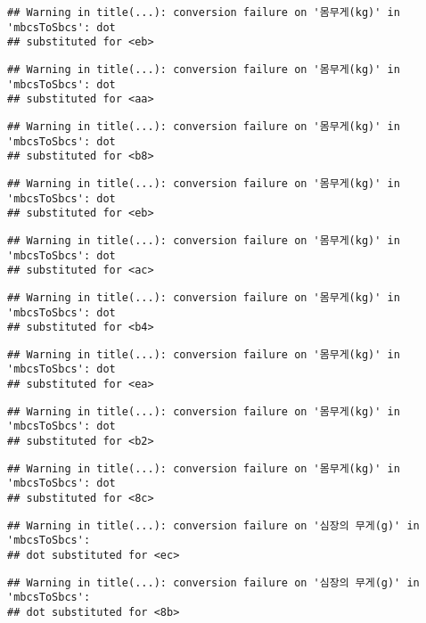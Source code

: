 \documentclass[
]{article}
\begin{document}
\begin{verbatim}
## Warning in title(...): conversion failure on '몸무게(kg)' in 'mbcsToSbcs': dot
## substituted for <eb>
\end{verbatim}

\begin{verbatim}
## Warning in title(...): conversion failure on '몸무게(kg)' in 'mbcsToSbcs': dot
## substituted for <aa>
\end{verbatim}

\begin{verbatim}
## Warning in title(...): conversion failure on '몸무게(kg)' in 'mbcsToSbcs': dot
## substituted for <b8>
\end{verbatim}

\begin{verbatim}
## Warning in title(...): conversion failure on '몸무게(kg)' in 'mbcsToSbcs': dot
## substituted for <eb>
\end{verbatim}

\begin{verbatim}
## Warning in title(...): conversion failure on '몸무게(kg)' in 'mbcsToSbcs': dot
## substituted for <ac>
\end{verbatim}

\begin{verbatim}
## Warning in title(...): conversion failure on '몸무게(kg)' in 'mbcsToSbcs': dot
## substituted for <b4>
\end{verbatim}

\begin{verbatim}
## Warning in title(...): conversion failure on '몸무게(kg)' in 'mbcsToSbcs': dot
## substituted for <ea>
\end{verbatim}

\begin{verbatim}
## Warning in title(...): conversion failure on '몸무게(kg)' in 'mbcsToSbcs': dot
## substituted for <b2>
\end{verbatim}

\begin{verbatim}
## Warning in title(...): conversion failure on '몸무게(kg)' in 'mbcsToSbcs': dot
## substituted for <8c>
\end{verbatim}

\begin{verbatim}
## Warning in title(...): conversion failure on '심장의 무게(g)' in 'mbcsToSbcs':
## dot substituted for <ec>
\end{verbatim}

\begin{verbatim}
## Warning in title(...): conversion failure on '심장의 무게(g)' in 'mbcsToSbcs':
## dot substituted for <8b>
\end{verbatim}
\end{document}
